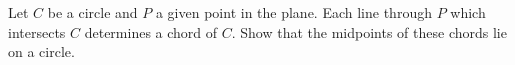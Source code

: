 Let $C$ be a circle and $P$ a given point in the plane. Each line through $P$ which intersects $C$ determines a chord of $C$. Show that the midpoints of these chords lie on a circle.